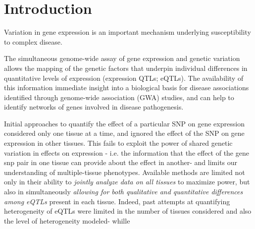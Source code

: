 \documentclass[10pt,letterpaper]{article}
\begin{document}



\linenumbers

\section*{Introduction}
Variation in gene expression is an important mechanism underlying susceptibility to complex disease.  

The simultaneous genome-wide assay of gene expression and genetic variation allows the mapping of the genetic factors that underpin individual differences in quantitative levels of expression (expression QTLs; eQTLs). 
The availability of this information immediate insight into a biological basis for disease associations identified through genome-wide association (GWA) studies, and can help to identify networks of genes 
involved in disease pathogenesis.

Initial approaches to quantify the effect of a particular SNP on gene expression considered only one tissue at a time, and ignored the effect of the SNP on gene expression in other tissues.
This fails to exploit the power of  shared genetic variation in effects on expression - i.e. the information that the effect of the gene snp pair in one tissue can provide about the effect in another- and limits our understanding of multiple-tissue phenotypes.
Available methods are limited not only in their ability to {\it jointly analyze data on all tissues} to maximize power, but also in simultaneously {\it allowing for both qualitative and quantitative differences among eQTLs} present in each tissue. Indeed, past attempts at quantifying heterogeneity of eQTLs were limited in the number of tissues considered and also the level of heterogeneity modeled- whille 
\end{document}
